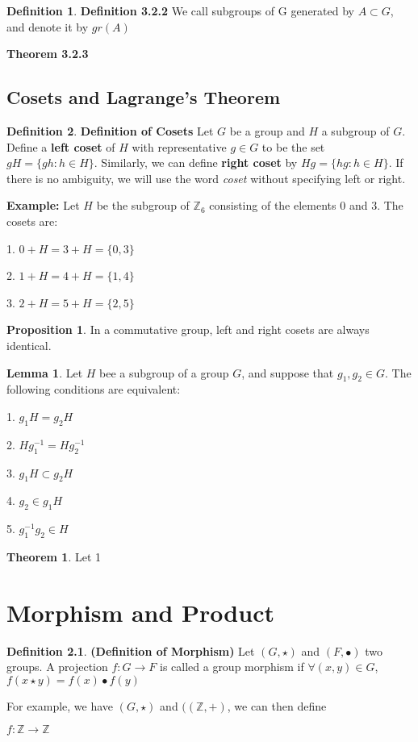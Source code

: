 \documentclass[12pt,openany]{book}
\theoremstyle{definition}
\newtheorem{defi}{Definition}[section]
\newtheorem{theorem}{Theorem}[section]
\newtheorem{proposition}{Proposition}[section]
\newtheorem{lemma}{Lemma}[section]
\theoremstyle{definition}
\begin{document}
\begin{defi}
\noindent\textbf{Definition 3.2.2} We call subgroups of G generated by $A \subset G$, and denote it by $gr(A)$
\end{defi}


\noindent\textbf{Theorem 3.2.3}

\section{Cosets and Lagrange's Theorem}

\begin{defi}
\textbf{Definition of Cosets} Let $G$ be a group and $H$ a subgroup of $G$. Define a \textbf{left coset} of $H$ with representative $g \in G$ to be the set $gH=\{gh: h \in H\}$. Similarly, we can define \textbf{right coset} by $Hg = \{hg: h\in H\}$. If there is no ambiguity, we will use the word \textit{coset} without specifying left or right.

\noindent\textbf{Example:} Let $H$ be the subgroup of $\mathbb{Z}_6$ consisting of the elements $0$ and $3$. The cosets are:
\end{defi}
1. $0+H=3+H=\{0,3\}$

2. $1+H=4+H=\{1,4\}$

3. $2+H=5+H=\{2,5\}$

\begin{proposition}
In a commutative group, left and right cosets are always identical.
\end{proposition}

\begin{lemma}
Let $H$ bee a subgroup of a group $G$, and suppose that $g_1,g_2 \in G$. The following conditions are equivalent:

1. $g_1H=g_2H$

2. $Hg_{1}^{-1}=Hg_{2}^{-1}$

3. $g_1H \subset g_2H$

4. $g_2 \in g_1H$

5. $g_1^{-1}g_2 \in H$
\end{lemma}

\begin{theorem}
Let 1
\end{theorem}

\chapter{Morphism and Product}

\begin{defi}
\noindent\textbf{(Definition of Morphism)} Let $(G, \star)$ and $(F, \bullet)$ two groups. A projection $f: G \to F$ is called a group morphism if $\forall (x, y) \in G$, $f(x \star y) = f(x) \bullet f(y)$

For example, we have $(G, \star)$ and $((\mathbb{Z}, +)$, we can then define

$f: \mathbb{Z} \to \mathbb{Z}$
\end{defi}
\end{document}
